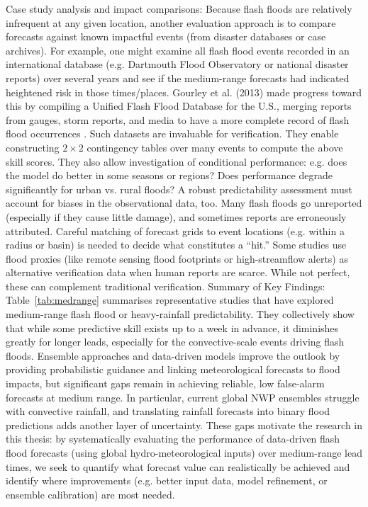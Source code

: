 Case study analysis and impact comparisons: Because flash floods are relatively infrequent at any given location, another evaluation approach is to compare forecasts against known impactful events (from disaster databases or case archives). For example, one might examine all flash flood events recorded in an international database (e.g. Dartmouth Flood Observatory or national disaster reports) over several years and see if the medium-range forecasts had indicated heightened risk in those times/places. Gourley et al. (2013) made progress toward this by compiling a Unified Flash Flood Database for the U.S., merging reports from gauges, storm reports, and media to have a more complete record of flash flood occurrences \citep{Gourley2013}. Such datasets are invaluable for verification. They enable constructing $2\times2$ contingency tables over many events to compute the above skill scores. They also allow investigation of conditional performance: e.g. does the model do better in some seasons or regions? Does performance degrade significantly for urban vs. rural floods? A robust predictability assessment must account for biases in the observational data, too. Many flash floods go unreported (especially if they cause little damage), and sometimes reports are erroneously attributed. Careful matching of forecast grids to event locations (e.g. within a radius or basin) is needed to decide what constitutes a “hit.” Some studies use flood proxies (like remote sensing flood footprints or high-streamflow alerts) as alternative verification data when human reports are scarce. While not perfect, these can complement traditional verification.
Summary of Key Findings: Table~\ref{tab:medrange} summarises representative studies that have explored medium-range flash flood or heavy-rainfall predictability. They collectively show that while some predictive skill exists up to a week in advance, it diminishes greatly for longer leads, especially for the convective-scale events driving flash floods. Ensemble approaches and data-driven models improve the outlook by providing probabilistic guidance and linking meteorological forecasts to flood impacts, but significant gaps remain in achieving reliable, low false-alarm forecasts at medium range. In particular, current global NWP ensembles struggle with convective rainfall, and translating rainfall forecasts into binary flood predictions adds another layer of uncertainty. These gaps motivate the research in this thesis: by systematically evaluating the performance of data-driven flash flood forecasts (using global hydro-meteorological inputs) over medium-range lead times, we seek to quantify what forecast value can realistically be achieved and identify where improvements (e.g. better input data, model refinement, or ensemble calibration) are most needed.

